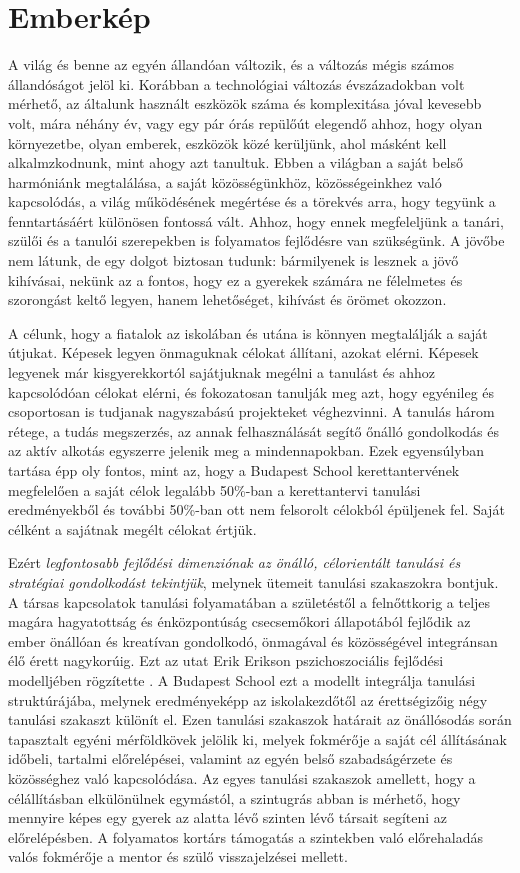 \section{Emberkép}
\label{sec:gyerekkep}

A világ és benne az egyén állandóan változik, és a változás mégis számos állandóságot jelöl ki. Korábban a technológiai változás évszázadokban volt mérhető, az általunk használt eszközök száma és komplexitása jóval kevesebb volt, mára néhány év, vagy egy pár órás repülőút elegendő ahhoz, hogy olyan környezetbe, olyan emberek, eszközök közé kerüljünk, ahol másként kell alkalmzkodnunk, mint ahogy azt tanultuk. Ebben a világban a saját belső harmóniánk megtalálása, a saját közösségünkhöz, közösségeinkhez való kapcsolódás, a világ működésének megértése és a törekvés arra, hogy tegyünk a fenntartásáért különösen fontossá vált. Ahhoz, hogy ennek megfeleljünk a tanári, szülői és a tanulói szerepekben is folyamatos fejlődésre van szükségünk. A jövőbe nem látunk, de egy dolgot biztosan tudunk: bármilyenek is lesznek a jövő kihívásai, nekünk az a fontos, hogy ez a gyerekek számára ne félelmetes és szorongást keltő legyen, hanem lehetőséget, kihívást és örömet okozzon.

A célunk, hogy a fiatalok az iskolában és utána is könnyen megtalálják a saját útjukat. Képesek legyen önmaguknak célokat állítani, azokat elérni. Képesek legyenek már kisgyerekkortól sajátjuknak megélni a tanulást és ahhoz kapcsolódóan célokat elérni, és fokozatosan tanulják meg azt, hogy egyénileg és csoportosan is tudjanak nagyszabású projekteket véghezvinni. A tanulás három rétege, a tudás megszerzés, az annak felhasználását segítő őnálló gondolkodás és az aktív alkotás egyszerre jelenik meg a mindennapokban. Ezek egyensúlyban tartása épp oly fontos, mint az, hogy a Budapest School kerettantervének megfelelően a saját célok legalább 50\%-ban a kerettantervi tanulási eredményekből és további 50\%-ban ott nem felsorolt célokból épüljenek fel. Saját célként a sajátnak megélt célokat értjük.

Ezért \emph{legfontosabb fejlődési dimenziónak az önálló, célorientált tanulási és stratégiai gondolkodást tekintjük}, melynek ütemeit tanulási szakaszokra bontjuk. A társas kapcsolatok tanulási folyamatában a születéstől a felnőttkorig a teljes magára hagyatottság és énközpontúság csecsemőkori állapotából fejlődik az ember önállóan és kreatívan gondolkodó, önmagával és közösségével integránsan élő érett nagykorúig. Ezt az utat Erik Erikson pszichoszociális fejlődési modelljében rögzítette \citep{Erikson91}. A Budapest School ezt a modellt integrálja tanulási struktúrájába, melynek eredményeképp az iskolakezdőtől az érettségizőig négy tanulási szakaszt különít el. Ezen tanulási szakaszok határait az önállósodás során tapasztalt egyéni mérföldkövek jelölik ki, melyek fokmérője a saját cél állításának időbeli, tartalmi előrelépései, valamint az egyén belső szabadságérzete és közösséghez való kapcsolódása. Az egyes tanulási szakaszok amellett, hogy a célállításban elkülönülnek egymástól, a szintugrás abban is mérhető, hogy mennyire képes egy gyerek az alatta lévő szinten lévő társait segíteni az előrelépésben. A folyamatos kortárs támogatás a szintekben való előrehaladás valós fokmérője a mentor és szülő visszajelzései mellett.

